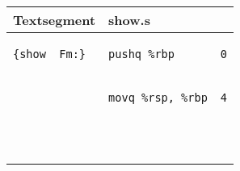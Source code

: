 \documentclass{ti2}
\begin{document}
\begin{tabular}{ | l | l | l|} \hline
  Textsegment&  show.s &  \\ \hline
\begin{lstlisting}
{show__Fm:}
\end{lstlisting} &
\begin{lstlisting}
pushq %rbp
\end{lstlisting} &
\begin{lstlisting}
0
\end{lstlisting} \\ \hline
\begin{lstlisting}
 
\end{lstlisting} &
\begin{lstlisting}
movq %rsp, %rbp
\end{lstlisting} &
\begin{lstlisting}
4
\end{lstlisting} \\ \hline
\begin{lstlisting}
 

\end{lstlisting}
\end{tabular}
\end{document}

